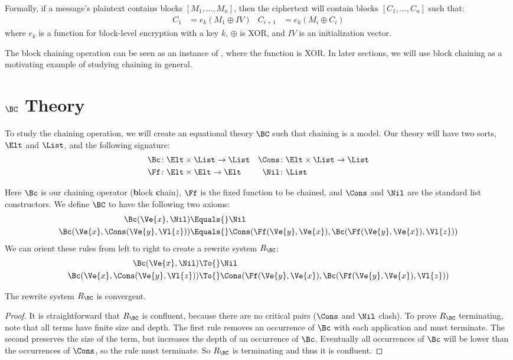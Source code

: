 Formally, if a message's plaintext contains blocks $[M_1, \dotsc, M_n]$, then
the ciphertext will contain blocks $[C_1, \dotsc, C_n]$ such that:
\begin{align*}
    C_1 &= e_k(M_1 \oplus IV) &
    C_{i+1} &= e_k(M_i \oplus C_i)
\end{align*}
where $e_k$ is a function for block-level encryption with a key $k$, $\oplus$
is XOR, and $IV$ is an initialization vector.

The block chaining operation can be seen as an instance of , where
the function is XOR. In later sections, we will use block chaining as a
motivating example of studying chaining in general.

\section{\texorpdfstring{$\BC$}{BC} Theory}\label{sec:bc-theory}
To study the chaining operation, we will create an equational theory $\BC$ such
that chaining is a model. Our theory will have two sorts, $\Elt$ and $\List$, and
the following signature:
\begin{align*}
    \Bc &\colon \Elt \times \List \to \List &
    \Cons &\colon \Elt \times \List \to \List \\
    \Ff &\colon \Elt \times \Elt \to \Elt &
    \Nil &\colon \List
\end{align*}

Here $\Bc$ is our chaining operator (\textbf{b}lock \textbf{c}hain), $\Ff$ is
the fixed function to be chained, and $\Cons$ and $\Nil$ are the standard list
constructors. We define $\BC$ to have the following two axioms:
\begin{align*}
    \Bc(\Ve{x}, \Nil) &\Equals{} \Nil \\
    \Bc(\Ve{x}, \Cons(\Ve{y}, \Vl{z}))
    &\Equals{} \Cons(\Ff(\Ve{y}, \Ve{x}), \Bc(\Ff(\Ve{y}, \Ve{x}), \Vl{z}))
\end{align*}
We can orient these rules from left to right to create a rewrite system
$R_\BC$:
\begin{align*}
    \Bc(\Ve{x}, \Nil) &\To{} \Nil \\
    \Bc(\Ve{x}, \Cons(\Ve{y}, \Vl{z}))
    &\To{} \Cons(\Ff(\Ve{y}, \Ve{x}), \Bc(\Ff(\Ve{y}, \Ve{x}), \Vl{z}))
\end{align*}

\begin{Lemma}
    The rewrite system $R_\BC$ is convergent.
\end{Lemma}
\begin{proof}
    It is straightforward that $R_\BC$ is confluent, because there are no
    critical pairs ($\Cons$ and $\Nil$ clash). To prove $R_\BC$ terminating,
    note that all terms have finite size and depth. The first rule removes an
    occurrence of $\Bc$ with each application and must terminate. The second
    preserves the size of the term, but increases the depth of an occurrence of
    $\Bc$. Eventually all occurrences of $\Bc$ will be lower than the
    occurrences of $\Cons$, so the rule must terminate. So $R_\BC$ is
    terminating and thus it is confluent.
\end{proof}


